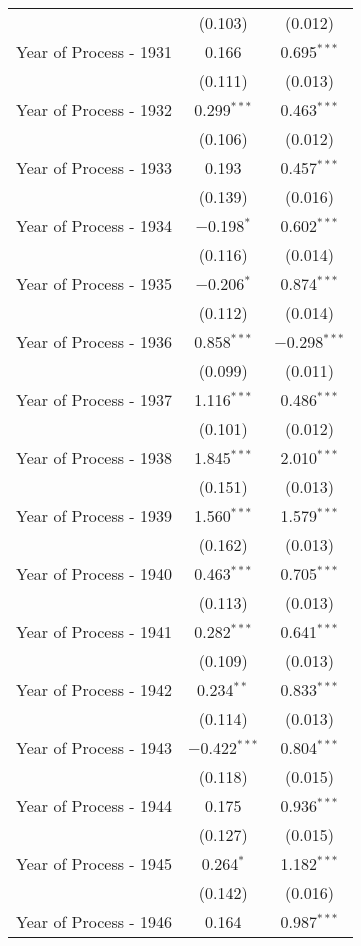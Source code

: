 \begin{table}[!h]
\begin{tabular}{@{\extracolsep{5pt}}lcc}
  & (0.103) & (0.012) \\ 
  Year of Process - 1931 & 0.166 & 0.695$^{***}$ \\ 
  & (0.111) & (0.013) \\ 
  Year of Process - 1932 & 0.299$^{***}$ & 0.463$^{***}$ \\ 
  & (0.106) & (0.012) \\ 
  Year of Process - 1933 & 0.193 & 0.457$^{***}$ \\ 
  & (0.139) & (0.016) \\ 
  Year of Process - 1934 & $-$0.198$^{*}$ & 0.602$^{***}$ \\ 
  & (0.116) & (0.014) \\ 
  Year of Process - 1935 & $-$0.206$^{*}$ & 0.874$^{***}$ \\ 
  & (0.112) & (0.014) \\ 
  Year of Process - 1936 & 0.858$^{***}$ & $-$0.298$^{***}$ \\ 
  & (0.099) & (0.011) \\ 
  Year of Process - 1937 & 1.116$^{***}$ & 0.486$^{***}$ \\ 
  & (0.101) & (0.012) \\ 
  Year of Process - 1938 & 1.845$^{***}$ & 2.010$^{***}$ \\ 
  & (0.151) & (0.013) \\ 
  Year of Process - 1939 & 1.560$^{***}$ & 1.579$^{***}$ \\ 
  & (0.162) & (0.013) \\ 
  Year of Process - 1940 & 0.463$^{***}$ & 0.705$^{***}$ \\ 
  & (0.113) & (0.013) \\ 
  Year of Process - 1941 & 0.282$^{***}$ & 0.641$^{***}$ \\ 
  & (0.109) & (0.013) \\ 
  Year of Process - 1942 & 0.234$^{**}$ & 0.833$^{***}$ \\ 
  & (0.114) & (0.013) \\ 
  Year of Process - 1943 & $-$0.422$^{***}$ & 0.804$^{***}$ \\ 
  & (0.118) & (0.015) \\ 
  Year of Process - 1944 & 0.175 & 0.936$^{***}$ \\ 
  & (0.127) & (0.015) \\ 
  Year of Process - 1945 & 0.264$^{*}$ & 1.182$^{***}$ \\ 
  & (0.142) & (0.016) \\ 
  Year of Process - 1946 & 0.164 & 0.987$^{***}$ \\ 

\end{tabular}
\end{table}
